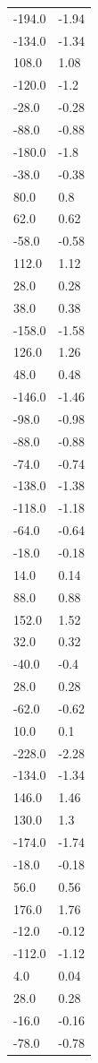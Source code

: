 \begin{longtable}{ll}
-194.0 & -1.94 \\
-134.0 & -1.34 \\
108.0 & 1.08 \\
-120.0 & -1.2 \\
-28.0 & -0.28 \\
-88.0 & -0.88 \\
-180.0 & -1.8 \\
-38.0 & -0.38 \\
80.0 & 0.8 \\
62.0 & 0.62 \\
-58.0 & -0.58 \\
112.0 & 1.12 \\
28.0 & 0.28 \\
38.0 & 0.38 \\
-158.0 & -1.58 \\
126.0 & 1.26 \\
48.0 & 0.48 \\
-146.0 & -1.46 \\
-98.0 & -0.98 \\
-88.0 & -0.88 \\
-74.0 & -0.74 \\
-138.0 & -1.38 \\
-118.0 & -1.18 \\
-64.0 & -0.64 \\
-18.0 & -0.18 \\
14.0 & 0.14 \\
88.0 & 0.88 \\
152.0 & 1.52 \\
32.0 & 0.32 \\
-40.0 & -0.4 \\
28.0 & 0.28 \\
-62.0 & -0.62 \\
10.0 & 0.1 \\
-228.0 & -2.28 \\
-134.0 & -1.34 \\
146.0 & 1.46 \\
130.0 & 1.3 \\
-174.0 & -1.74 \\
-18.0 & -0.18 \\
56.0 & 0.56 \\
176.0 & 1.76 \\
-12.0 & -0.12 \\
-112.0 & -1.12 \\
4.0 & 0.04 \\
28.0 & 0.28 \\
-16.0 & -0.16 \\
-78.0 & -0.78 \\

\end{longtable}
